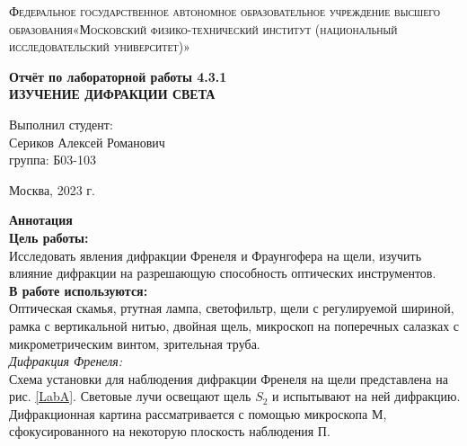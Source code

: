 \documentclass[a4paper, 12pt]{article}%
\newcommand{\RomanNumeralCaps}[1]{\uppercase\expandafter{\romannumeral#1}}
\begin{document}
	\begin{titlepage}
		\begin{center}
			\textsc{Федеральное государственное автономное образовательное учреждение высшего образования«Московский физико-технический институт (национальный исследовательский университет)»\\[5mm]
			}
			
			\vfill
			
			\textbf{Отчёт по лабораторной работы 4.3.1 \\[3mm]
				ИЗУЧЕНИЕ ДИФРАКЦИИ СВЕТА
				\\[50mm]
			}
			
		\end{center}
		
		\hfill
		\begin{minipage}{.5\textwidth}
			Выполнил студент:\\[2mm]
			Сериков Алексей Романович\\[2mm]
			группа: Б03-103\\[5mm]
			
		\end{minipage}
		\vfill
		\begin{center}
			Москва, 2023 г.
		\end{center}
		
	\end{titlepage}
	
	\newpage
	\textbf{Аннотация}\\
	
	
	\textbf{Цель работы: }\\
	
	Исследовать явления дифракции Френеля и Фраунгофера на щели, изучить влияние дифракции на разрешающую способность оптических инструментов.\\
	
	\textbf{В работе используются: }\\
	
	Оптическая скамья, ртутная лампа, светофильтр, щели с регулируемой шириной, рамка с вертикальной нитью, двойная щель, микроскоп на поперечных салазках с микрометрическим винтом, зрительная труба.\\
	
\RomanNumeralCaps 1 \textit{Дифракция Френеля:}\\
	
	
	Схема установки для наблюдения дифракции Френеля на щели представлена на рис. \ref{LabA}. Световые лучи освещают щель $ S_2 $ и испытывают на ней дифракцию. Дифракционная картина рассматривается с помощью микроскопа М, сфокусированного на некоторую плоскость наблюдения П.
	
\end{document}
